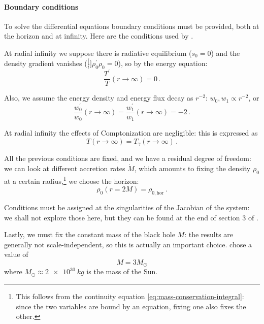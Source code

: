 \documentclass[main.tex]{subfiles}
\begin{document}
\paragraph{Boundary conditions}

To solve the differential equations boundary conditions must be provided, both at the horizon and at infinity. Here are the conditions used by \textcite[]{NobiliTurollaZampieri:1991dec}.

At radial infinity we suppose there is radiative equilibrium (\(s_0 = 0\)) and the density gradient vanishes (\(\frac[i]{\rho_0 ^{\prime}}{\rho_0} = 0 \)), so by the energy equation:
%
\begin{equation}
  \frac{T ^{\prime}}{T} (r \rightarrow \infty) = 0\,.
\end{equation}

Also, we assume the energy density and energy flux decay as \(r^{-2}\): \(w_0,w_1 \propto r^{-2}\), or
%
\begin{equation}
  \frac{w_0 ^{\prime}}{w_0} (r \rightarrow \infty) = \frac{w_1 ^{\prime}}{w_1} (r \rightarrow \infty) = -2\,.
\end{equation}

At radial infinity the effects of Comptonization are negligible: this is expressed as
%
\begin{equation}
  T(r \rightarrow \infty) = T_\gamma (r \rightarrow \infty)\,.
\end{equation}

All the previous conditions are fixed, and we have a residual degree of freedom: we can look at different accretion rates \(\dot{M}\), which amounts to fixing the density
\(\rho_0\) at a certain radius,\footnote{This follows from the continuity equation  \eqref{eq:mass-conservation-integral}: since the two variables are bound by an equation, fixing one also fixes the other.} we choose the horizon:
%
\begin{equation}
  \rho_0(r = 2M) = \rho_{0, \text{hor}}\,.
\end{equation}

Conditions must be assigned at the singularities of the Jacobian of the system: we shall not explore those here, but they can be found at the end of section 3 of \cite[]{NobiliTurollaZampieri:1991dec}.

Lastly, we must fix the constant mass of the black hole \(M\): the results are generally not scale-independent, so this is actually an important choice. \textcite[]{NobiliTurollaZampieri:1991dec} chose a value of
%
\begin{equation}
    M = 3 M_{\odot}
\end{equation}
%
where \(M_\odot \approx \SI{2e30}{kg}\) is the mass of the Sun.
\end{document}
